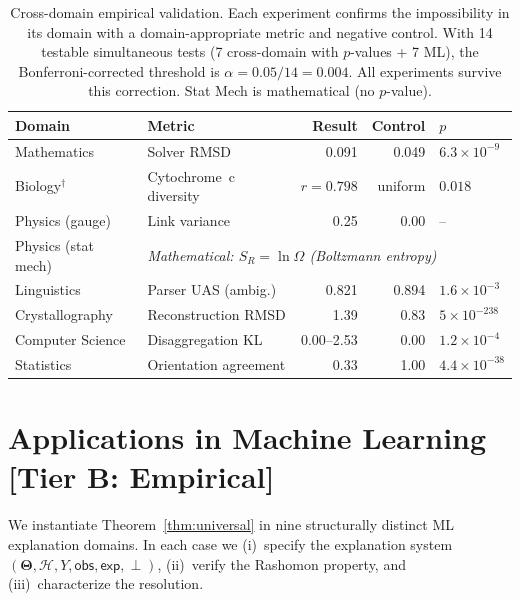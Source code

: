 \documentclass[11pt,a4paper]{article}
\newcommand{\Params}{\mathbf{\Theta}}
\newcommand{\sH}{\mathcal{H}}
\newcommand{\incomp}{\perp}
\begin{document}
\begin{table}[t]
\centering
\caption{Cross-domain empirical validation.  Each experiment confirms the impossibility in its domain with a domain-appropriate metric and negative control.  With 14 testable simultaneous tests (7 cross-domain with $p$-values + 7 ML), the Bonferroni-corrected threshold is $\alpha = 0.05/14 = 0.004$.  All experiments survive this correction.  Stat Mech is mathematical (no $p$-value).}
\label{tab:cross-domain}
\begin{tabular}{llrrl}
\toprule
Domain & Metric & Result & Control & $p$ \\
\midrule
Mathematics & Solver RMSD & 0.091 & 0.049 & $6.3{\times}10^{-9}$ \\
Biology$^\dagger$ & Cytochrome~c diversity & $r = 0.798$ & uniform & $0.018$ \\
Physics (gauge) & Link variance & 0.25 & 0.00 & -- \\
Physics (stat mech) & \multicolumn{4}{l}{\textit{Mathematical: $S_R = \ln\Omega$ (Boltzmann entropy)}} \\
Linguistics & Parser UAS (ambig.) & 0.821 & 0.894 & $1.6{\times}10^{-3}$ \\
Crystallography & Reconstruction RMSD & 1.39 & 0.83 & $5{\times}10^{-238}$ \\
Computer Science & Disaggregation KL & 0.00--2.53 & 0.00 & $1.2{\times}10^{-4}$ \\
Statistics & Orientation agreement & 0.33 & 1.00 & $4.4{\times}10^{-38}$ \\
\bottomrule
\end{tabular}

\smallskip
{}
\end{table}

\section{Applications in Machine Learning\,\textnormal{\normalsize[Tier B: Empirical]}}
\label{sec:ml-instances}

We instantiate Theorem~\ref{thm:universal} in nine structurally distinct
ML explanation domains.  In each case we (i)~specify the explanation system
$(\Params, \sH, Y, \mathsf{obs}, \mathsf{exp}, \incomp)$, (ii)~verify the
Rashomon property, and (iii)~characterize the resolution.
\end{document}
